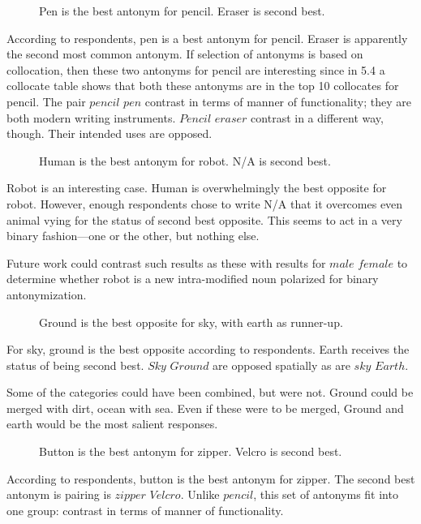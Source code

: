 \begin{figure}[here]
	\centering
	\caption{Pen is the best antonym for pencil. Eraser is second best.}
	\label{fig:pencil_responses}
\end{figure}


According to respondents, pen is a best antonym for pencil.  Eraser is apparently the second most common antonym.  If selection of antonyms is based on collocation, then these two antonyms for pencil are interesting since in 5.4 a collocate table shows that both these antonyms are in the top 10 collocates for pencil.  The pair $pencil$ \opp $pen$ contrast in terms of manner of functionality; they are both modern writing instruments.  $Pencil$ \opp $eraser$ contrast in a different way, though.  Their intended uses are opposed.

\begin{figure}[here]
	\centering
	\caption{Human is the best antonym for robot.  N/A is second best.}
	\label{fig:robot_responses}
\end{figure}

Robot is an interesting case.  Human is overwhelmingly the best opposite for robot.  However, enough respondents chose to write N/A that it overcomes even animal vying for the status of second best opposite.  This seems to act in a very binary fashion—one or the other, but nothing else.  

Future work could contrast such results as these with results for $male$ \opp $female$ to determine whether robot is a new intra-modified noun polarized for binary antonymization.

\begin{figure}[here]
	\centering
	\caption{Ground is the best opposite for sky, with earth as runner-up.}
	\label{fig:sky_responses}
\end{figure}


For sky, ground is the best opposite according to respondents.  Earth receives the status of being second best.  $Sky$ \opp $Ground$ are opposed spatially as are $sky$ \opp $Earth$.  

Some of the categories could have been combined, but were not. Ground could be merged with dirt, ocean with sea.  Even if these were to be merged, Ground and earth would be the most salient responses.

\begin{figure}[here]
	\centering
	\caption{Button is the best antonym for zipper. Velcro is second best.}
	\label{fig:zipper_responses}
\end{figure}

According to respondents, button is the best antonym for zipper.  The second best antonym is pairing is $zipper$ \opp $Velcro$.  Unlike $pencil$, this set of antonyms fit into one group: contrast in terms of manner of functionality.  

